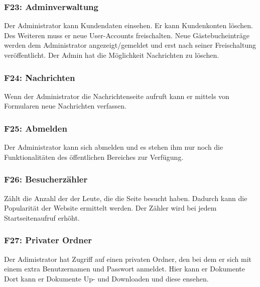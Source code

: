 \documentclass[10pt,a4paper]{scrartcl}
\begin{document}
\subsubsection*{F23: Adminverwaltung}

Der Administrator kann Kundendaten einsehen. Er kann Kundenkonten löschen. Des Weiteren muss er neue User-Accounts freischalten.
Neue Gästebucheinträge werden dem Administrator angezeigt/gemeldet und erst nach seiner Freischaltung veröffentlicht.
Der Admin hat die Möglichkeit Nachrichten zu löschen.

\subsubsection*{F24: Nachrichten}
Wenn der Administrator die Nachrichtenseite aufruft kann er mittels von Formularen neue Nachrichten verfassen.

%



\subsubsection*{F25: Abmelden}

Der Administrator kann sich abmelden und es stehen ihm nur noch die Funktionalitäten des öffentlichen Bereiches zur Verfügung.

\subsubsection*{F26: Besucherzähler}

Zählt die Anzahl der der Leute, die die Seite besucht haben. Dadurch kann die Popularität der Website ermittelt werden.
Der Zähler wird bei jedem Startseitenaufruf erhöht.

\subsubsection*{F27: Privater Ordner}
Der Adimistrator hat Zugriff auf einen privaten Ordner, den bei dem er sich mit einem extra Benutzernamen und Passwort anmeldet. Hier kann er Dokumente 
Dort kann er Dokumente Up- und Downloaden und diese ensehen.
\end{document}
